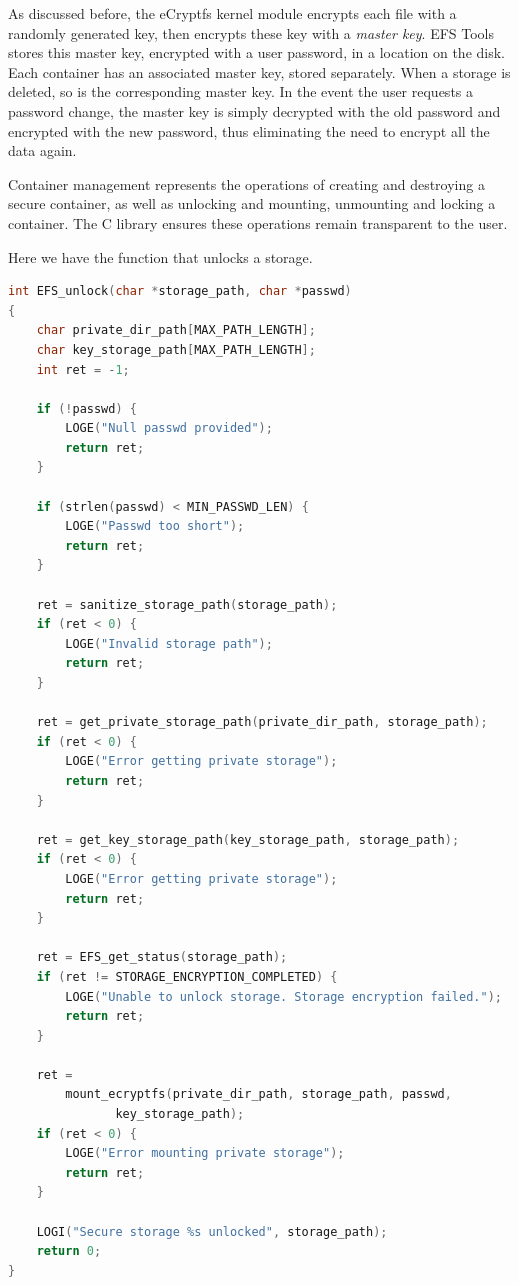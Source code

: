 As discussed before, the eCryptfs kernel module encrypts each file with a randomly generated key, then encrypts these key with a \textit{master key}. EFS Tools stores this master key, encrypted with a user password, in a location on the disk. Each container has an associated master key, stored separately. When a storage is deleted, so is the corresponding master key. In the event the user requests a password change, the master key is simply decrypted with the old password and encrypted with the new password, thus eliminating the need to encrypt all the data again.

Container management represents the operations of creating and destroying a secure container, as well as unlocking and mounting, unmounting and locking a container. The C library ensures these operations remain transparent to the user.

Here we have the function that unlocks a storage.

\begin{lstlisting}[basicstyle=\ttfamily\small, language=C, caption=EFS unlock operation, label=lst:efs-unlock]
int EFS_unlock(char *storage_path, char *passwd)
{
    char private_dir_path[MAX_PATH_LENGTH];
    char key_storage_path[MAX_PATH_LENGTH];
    int ret = -1;

    if (!passwd) {
        LOGE("Null passwd provided");
        return ret;
    }

    if (strlen(passwd) < MIN_PASSWD_LEN) {
        LOGE("Passwd too short");
        return ret;
    }

    ret = sanitize_storage_path(storage_path);
    if (ret < 0) {
        LOGE("Invalid storage path");
        return ret;
    }

    ret = get_private_storage_path(private_dir_path, storage_path);
    if (ret < 0) {
        LOGE("Error getting private storage");
        return ret;
    }

    ret = get_key_storage_path(key_storage_path, storage_path);
    if (ret < 0) {
        LOGE("Error getting private storage");
        return ret;
    }

    ret = EFS_get_status(storage_path);
    if (ret != STORAGE_ENCRYPTION_COMPLETED) {
        LOGE("Unable to unlock storage. Storage encryption failed.");
        return ret;
    }

    ret =
        mount_ecryptfs(private_dir_path, storage_path, passwd,
               key_storage_path);
    if (ret < 0) {
        LOGE("Error mounting private storage");
        return ret;
    }

    LOGI("Secure storage %s unlocked", storage_path);
    return 0;
}
\end{lstlisting}

